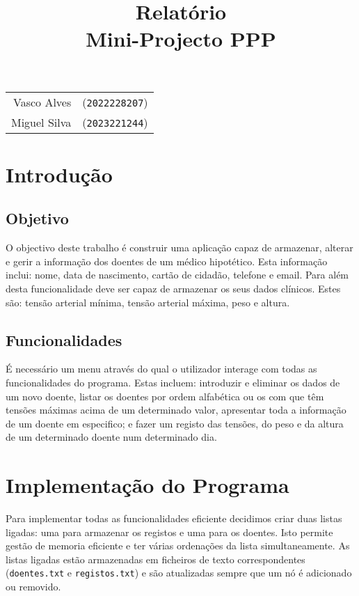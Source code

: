 \documentclass[a4paper, 12pt]{article}
\title{\sffamily\huge\bfseries Relatório\\[1ex]\Large Mini-Projecto PPP}
\author{ }
\newcommand\code[1]{\texttt{\sloppy #1}}
\begin{document}
\maketitle
\begin{center}
    \large
\begin{tabular}{ r l }
        Vasco Alves &(\texttt{2022228207})\\
        Miguel Silva &(\texttt{2023221244})\\
    \end{tabular}
\end{center}

\tableofcontents
\newpage

\section{Introdução}

\subsection{Objetivo}

O objectivo deste trabalho é construir uma aplicação capaz de armazenar, alterar e gerir a informação dos doentes de um médico hipotético. Esta informação inclui: nome, data de nascimento, cartão de cidadão, telefone e email. Para além desta funcionalidade deve ser capaz de armazenar os seus dados clínicos. Estes são: tensão arterial mínima, tensão arterial máxima, peso e altura. 

\subsection{Funcionalidades }

É necessário um menu através do qual o utilizador interage com todas as funcionalidades do programa. Estas incluem: introduzir e eliminar os dados de um novo doente, listar os doentes por ordem alfabética ou os com que têm tensões máximas acima de um determinado valor, apresentar toda a informação de um doente em especifico; e fazer um registo das tensões, do peso e da altura de um determinado doente num determinado dia.

\section{Implementação do Programa}

Para implementar todas as funcionalidades eficiente decidimos criar duas listas ligadas: uma para armazenar os registos e uma para os doentes. Isto permite gestão de memoria eficiente e ter várias ordenações da lista simultaneamente. As listas ligadas estão armazenadas em ficheiros de texto correspondentes (\code{doentes.txt} e \code{registos.txt}) e são atualizadas sempre que um nó é adicionado ou removido.
\end{document}
